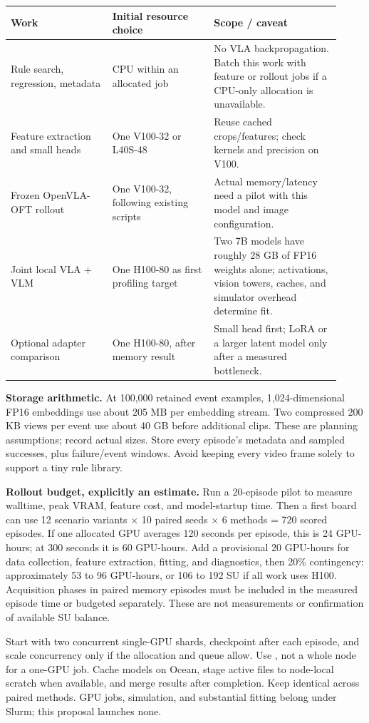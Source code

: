 \documentclass[10pt]{article}
\newcommand{\code}[1]{\texttt{\detokenize{#1}}}
\begin{document}
\begin{tabular}{p{0.28\linewidth}p{0.29\linewidth}p{0.35\linewidth}}
\toprule
Work & Initial resource choice & Scope / caveat\\\midrule
Rule search, regression, metadata & CPU within an allocated job & No VLA backpropagation. Batch this work with feature or rollout jobs if a CPU-only allocation is unavailable.\\
Feature extraction and small heads & One V100-32 or L40S-48 & Reuse cached crops/features; check kernels and precision on V100.\\
Frozen OpenVLA-OFT rollout & One V100-32, following existing scripts & Actual memory/latency need a pilot with this model and image configuration.\\
Joint local VLA + VLM & One H100-80 as first profiling target & Two 7B models have roughly 28 GB of FP16 weights alone; activations, vision towers, caches, and simulator overhead determine fit.\\
Optional adapter comparison & One H100-80, after memory result & Small head first; LoRA or a larger latent model only after a measured bottleneck.\\
\bottomrule
\end{tabular}

\textbf{Storage arithmetic.} At 100,000 retained event examples, 1,024-dimensional FP16 embeddings use about 205 MB per embedding stream. Two compressed 200 KB views per event use about 40 GB before additional clips. These are planning assumptions; record actual sizes. Store every episode's metadata and sampled successes, plus failure/event windows. Avoid keeping every video frame solely to support a tiny rule library.

\textbf{Rollout budget, explicitly an estimate.} Run a 20-episode pilot to measure walltime, peak VRAM, feature cost, and model-startup time. Then a first board can use 12 scenario variants $\times$ 10 paired seeds $\times$ 6 methods = 720 scored episodes. If one allocated GPU averages 120 seconds per episode, this is 24 GPU-hours; at 300 seconds it is 60 GPU-hours. Add a provisional 20 GPU-hours for data collection, feature extraction, fitting, and diagnostics, then 20\% contingency: approximately 53 to 96 GPU-hours, or 106 to 192 SU if all work uses H100. Acquisition phases in paired memory episodes must be included in the measured episode time or budgeted separately. These are not measurements or confirmation of available SU balance.

Start with two concurrent single-GPU shards, checkpoint after each episode, and scale concurrency only if the allocation and queue allow. Use \code{GPU-shared}, not a whole node for a one-GPU job. Cache models on Ocean, stage active files to node-local scratch when available, and merge results after completion. Keep \code{env_seed} identical across paired methods. GPU jobs, simulation, and substantial fitting belong under Slurm; this proposal launches none.
\end{document}
